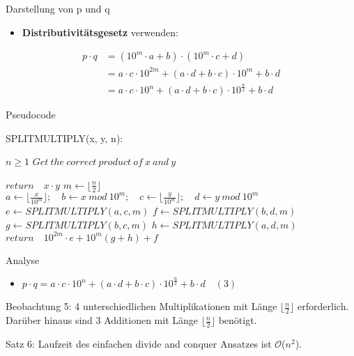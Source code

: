 \documentclass{beamer}
\begin{document}
\begin{frame}{Darstellung von p und q}
    \begin{itemize}
        \item \textbf{Distributivitätsgesetz} verwenden:
    \end{itemize}
    \begin{align}
    p \cdot q &= (10^{m} \cdot a + b) \cdot (10^{m} \cdot c + d)\\
    &= a \cdot c \cdot 10^{2m} + (a \cdot d + b \cdot c) \cdot 10^{m} + b \cdot d\\
    &= a \cdot c \cdot 10^{n} + (a \cdot d + b \cdot c) \cdot 10^{\frac{n}{2}} + b \cdot d
    \end{align}
\end{frame}

\begin{frame}{Pseudocode}
\begin{algorithm}[H]                           %
\caption{SPLITMULTIPLY(x, y, n):}          %
\label{alg1}      %
\begin{algorithmic}  %
\REQUIRE $n \geq 1 $
\ENSURE $Get \ the \ correct \ product \ of \ x \ and \ y$

\STATE $return \quad x \cdot y$
\ELSE
\STATE $m \leftarrow \lfloor \frac{n}{2} \rfloor$
\STATE $a \leftarrow \lfloor \frac{x}{10^m} \rfloor; \quad  b \leftarrow x \ mod \ 10^m; \quad c \leftarrow \lfloor \frac{y}{10^m} \rfloor; \quad d \leftarrow y \ mod \ 10^m$
\STATE $e \leftarrow SPLITMULTIPLY(a, c, m)$
\STATE $f \leftarrow SPLITMULTIPLY(b, d, m)$
\STATE $g \leftarrow SPLITMULTIPLY(b, c, m)$
\STATE $h \leftarrow SPLITMULTIPLY(a, d, m)$
\STATE $return \quad 10^{2m} \cdot e + 10^{m}(g+h) + f$
\ENDIF
\end{algorithmic}
\end{algorithm}
\end{frame}

\begin{frame}{Analyse}
\begin{itemize}
    \item $p \cdot q = a \cdot c \cdot 10^{n} + (a \cdot d + b \cdot c) \cdot 10^{\frac{n}{2}} + b \cdot d \quad (3)$
\end{itemize}
\begin{block}{Beobachtung 5: }
4 unterschiedlichen Multiplikationen mit Länge $\lfloor \frac{n}{2} \rfloor$ erforderlich.\\ Darüber hinaus sind 3 Additionen mit Länge $\lfloor \frac{n}{2} \rfloor$ benötigt.
\end{block}

\begin{block}{Satz 6: }
Laufzeit des einfachen divide and conquer Ansatzes ist $\mathcal{O}$($n^{2}$).
\end{block}
\end{frame}
\end{document}

